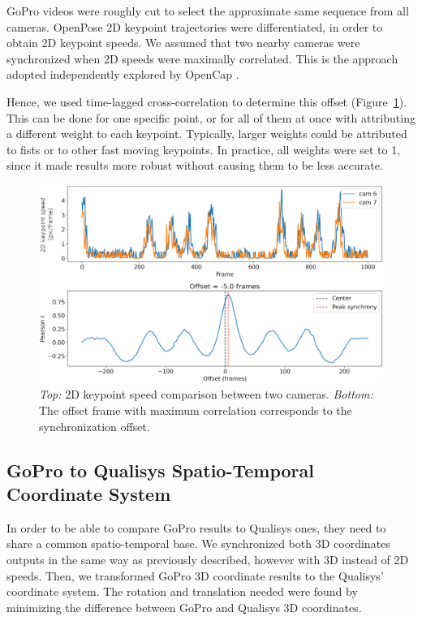 GoPro videos were roughly cut to select the approximate same sequence from all cameras. OpenPose 2D keypoint trajectories were differentiated, in order to obtain 2D keypoint speeds. We assumed that two nearby cameras were synchronized when 2D speeds were maximally correlated. This is the approach adopted independently explored by OpenCap \cite{Uhlrich2022}.

Hence, we used time-lagged cross-correlation to determine this offset (Figure~\ref{fig_sync}). This can be done for one specific point, or for all of them at once with attributing a different weight to each keypoint. Typically, larger weights could be attributed to fists or to other fast moving keypoints. In practice, all weights were set to 1, since it made results more robust without causing them to be less accurate.

\begin{figure}[!ht]
	\centering
	\def\svgwidth{1\columnwidth}
	\fontsize{10pt}{10pt}\selectfont
	\includegraphics[width=\linewidth]{"../Chap6/Figures/Fig_Sync.png"}
	\caption{\textit{Top:} 2D keypoint speed comparison between two cameras. \textit{Bottom:} The offset frame with maximum correlation corresponds to the synchronization offset.}
      \label{fig_sync}
\end{figure}


\FloatBarrier
\subsection{GoPro to Qualisys Spatio-Temporal Coordinate System}

In order to be able to compare GoPro results to Qualisys ones, they need to share a common spatio-temporal base. We synchronized both 3D coordinates outputs in the same way as previously described, however with 3D instead of 2D speeds. Then, we transformed GoPro 3D coordinate results to the Qualisys' coordinate system. The rotation and translation needed were found by minimizing the difference between GoPro and Qualisys 3D coordinates.


